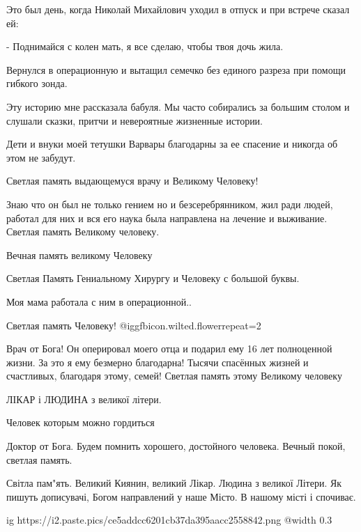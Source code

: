 \begin{itemize}
Это был день, когда Николай Михайлович уходил в отпуск и при встрече сказал ей:

- Поднимайся с колен мать, я все сделаю, чтобы твоя дочь жила.

Вернулся в операционную и вытащил семечко без единого разреза при помощи
гибкого зонда.

Эту историю мне рассказала бабуля. Мы часто собирались за большим столом и
слушали сказки, притчи и невероятные жизненные истории.

Дети и внуки моей тетушки Варвары благодарны за ее спасение и никогда об этом
не забудут.

Светлая память выдающемуся врачу и Великому Человеку!


Знаю что он был не только гением но и безсеребрянником, жил ради людей, работал
для них и вся его наука была направлена на лечение и выживание. Светлая память
Великому человеку.

Вечная память великому Человеку

Светлая Память Гениальному Хирургу и Человеку с большой буквы.

Моя мама работала с ним в операционной..

Светлая память Человеку! @igg{fbicon.wilted.flower}{repeat=2} 


Врач от Бога! Он оперировал моего отца и подарил ему 16 лет полноценной жизни.
За это я ему безмерно благодарна! Тысячи спасённых жизней и счастливых,
благодаря этому, семей! Светлая память этому Великому человеку


ЛІКАР і ЛЮДИНА з великої літери.

Человек которым можно гордиться


Доктор от Бога.
Будем помнить хорошего, достойного человека.
Вечный покой, светлая память.


Світла пам"ять. Великий Киянин, великий Лікар. Людина з великої Літери. Як
пишуть дописувачі, Богом направлений у наше Місто. В нашому місті і спочиває.



\ifcmt
  ig https://i2.paste.pics/ce5addcc6201cb37da395aacc2558842.png
  @width 0.3
\fi


\end{itemize}
